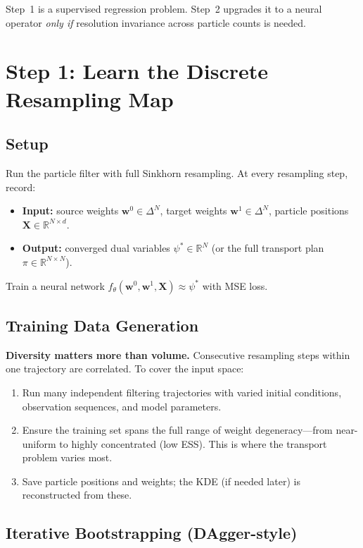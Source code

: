 \documentclass[11pt]{article}
\newcommand{\RR}{\mathbb{R}}
\newcommand{\bw}{\mathbf{w}}
\newcommand{\bX}{\mathbf{X}}
\begin{document}
Step~1 is a supervised regression problem. Step~2 upgrades it to a neural operator \emph{only if} resolution invariance across particle counts is needed.

\section{Step 1: Learn the Discrete Resampling Map}

\subsection{Setup}

Run the particle filter with full Sinkhorn resampling. At every resampling step, record:
\begin{itemize}[nosep,leftmargin=1.5em]
    \item \textbf{Input:} source weights $\bw^0 \in \Delta^N$, target weights $\bw^1 \in \Delta^N$, particle positions $\bX \in \RR^{N \times d}$.
    \item \textbf{Output:} converged dual variables $\psi^* \in \RR^N$ (or the full transport plan $\pi \in \RR^{N \times N}$).
\end{itemize}
Train a neural network $f_\theta(\bw^0, \bw^1, \bX) \approx \psi^*$ with MSE loss.

\subsection{Training Data Generation}

\textcolor{keypoint}{\textbf{Diversity matters more than volume.}} Consecutive resampling steps within one trajectory are correlated. To cover the input space:
\begin{enumerate}[nosep,leftmargin=1.5em]
    \item Run many independent filtering trajectories with varied initial conditions, observation sequences, and model parameters.
    \item Ensure the training set spans the full range of weight degeneracy---from near-uniform to highly concentrated (low ESS). This is where the transport problem varies most.
    \item Save particle positions and weights; the KDE (if needed later) is reconstructed from these.
\end{enumerate}

\subsection{Iterative Bootstrapping (DAgger-style)}
\end{document}
